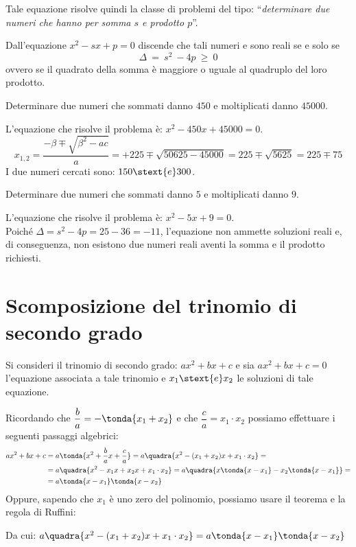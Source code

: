 Tale equazione risolve quindi la classe di problemi del tipo: 
``\emph{determinare due numeri che hanno per somma \(s\) e 
prodotto \(p\)}''.

Dall'equazione \(x^2 -s x +p = 0\) discende che tali numeri e sono 
reali se e solo se 
\[\Delta~=~s^{2}~-4p~\geq~0\] 
ovvero se il quadrato della somma è maggiore o uguale al quadruplo del loro 
prodotto.

\begin{esempio}{}{}
Determinare due numeri che sommati danno \(450\) e moltiplicati danno 
\(45000\).

L'equazione che risolve il problema è: \(x^2 -450 x +45000 = 0\). 
\[
x_{1,2} = \dfrac{-\beta \mp \sqrt{\beta^2 -ac}}{a} = 
+225 \mp \sqrt{50625-45000} = 225 \mp \sqrt{5625} = 225 \mp 75\]
I due numeri cercati sono: \(150 \stext{e} 300\).
\end{esempio}

\begin{esempio}{}{}
Determinare due numeri che sommati danno \(5\) e moltiplicati danno \(9\).

L'equazione che risolve il problema è: \(x^2 -5x +9 = 0\). \\
Poiché \(\Delta = s^{2} -4 p = 25 -36 = -11\), l'equazione non ammette 
soluzioni reali e, di conseguenza, non esistono due numeri reali aventi la 
somma e il prodotto richiesti.
\end{esempio}

\section{Scomposizione del trinomio di secondo grado}
\label{sec:eq2gr_scomposizione_trinomio}
Si consideri il trinomio di secondo grado: \(a x^2 +b x +c\) e sia 
\(a x^2 + b x +c = 0\) l'equazione associata a tale trinomio e 
\(x_1 \stext{e} x_2\) le soluzioni di tale equazione. 

Ricordando che \(\dfrac{b}{a} = - \tonda{x_1 +x_2}\) e che 
\(\dfrac{c}{a} = x_1  \cdot x_2\) possiamo effettuare i seguenti passaggi 
algebrici:
\begin{align*}
a x^2 +b x +c &= 
  a \tonda{x^2 +\dfrac{b}{a} x +\dfrac{c}{a}}=
  a \quadra{x^2 -(x_1 +x_2) x +x_1 \cdot x_2}=\\
  &=a \quadra{x^2 -x_1 x +x_2 x +x_1 \cdot x_2}=
  a \quadra{x \tonda{x -x_1} -x_2 \tonda{x -x_1}}=\\
  &=a \tonda{x -x_1} \tonda{x -x_2}
 \end{align*}
{Oppure, sapendo che \(x_1\) è uno zero del polinomio, possiamo usare il 
teorema e la regola di Ruffini:}
{\begin{center}
\end{center}}
Da cui: \(a \quadra{x^2 -(x_1 +x_2) x +x_1 \cdot x_2}=
          a \tonda{x -x_1} \tonda{x -x_2}\)

